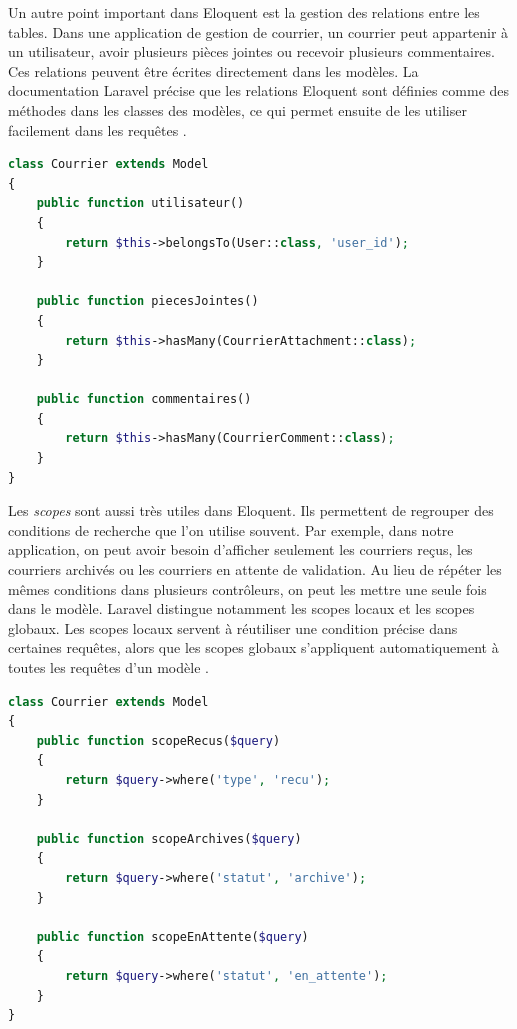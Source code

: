 Un autre point important dans Eloquent est la gestion des relations entre les tables. Dans une application de gestion de courrier, un courrier peut appartenir à un utilisateur, avoir plusieurs pièces jointes ou recevoir plusieurs commentaires. Ces relations peuvent être écrites directement dans les modèles. La documentation Laravel précise que les relations Eloquent sont définies comme des méthodes dans les classes des modèles, ce qui permet ensuite de les utiliser facilement dans les requêtes \cite{laravel_relationships}.

\begin{lstlisting}[language=PHP, caption={Exemple de relations dans un modèle Courrier}]
class Courrier extends Model
{
    public function utilisateur()
    {
        return $this->belongsTo(User::class, 'user_id');
    }

    public function piecesJointes()
    {
        return $this->hasMany(CourrierAttachment::class);
    }

    public function commentaires()
    {
        return $this->hasMany(CourrierComment::class);
    }
}
\end{lstlisting}

Les \textit{scopes} sont aussi très utiles dans Eloquent. Ils permettent de regrouper des conditions de recherche que l’on utilise souvent. Par exemple, dans notre application, on peut avoir besoin d’afficher seulement les courriers reçus, les courriers archivés ou les courriers en attente de validation. Au lieu de répéter les mêmes conditions dans plusieurs contrôleurs, on peut les mettre une seule fois dans le modèle. Laravel distingue notamment les scopes locaux et les scopes globaux. Les scopes locaux servent à réutiliser une condition précise dans certaines requêtes, alors que les scopes globaux s’appliquent automatiquement à toutes les requêtes d’un modèle \cite{laravel_eloquent}.

\begin{lstlisting}[language=PHP, caption={Exemple de scopes locaux pour les courriers}]
class Courrier extends Model
{
    public function scopeRecus($query)
    {
        return $query->where('type', 'recu');
    }

    public function scopeArchives($query)
    {
        return $query->where('statut', 'archive');
    }

    public function scopeEnAttente($query)
    {
        return $query->where('statut', 'en_attente');
    }
}
\end{lstlisting}

